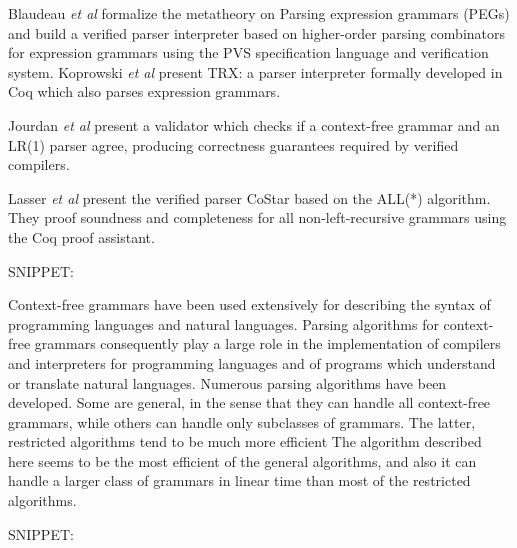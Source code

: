 \begin{isabellebody}
\begin{isamarkuptext}
Blaudeau \textit{et al} \cite{Blaudeau:2020} formalize the metatheory on Parsing expression grammars (PEGs) and
build a verified parser interpreter based on higher-order parsing combinators for expression grammars
using the PVS specification language and verification system. Koprowski \textit{et al} \cite{Koprowski:2011}
present TRX: a parser interpreter formally developed in Coq which also parses expression grammars.

Jourdan \textit{et al} \cite{Jourdan:2012} present a validator which checks if a context-free grammar
and an LR(1) parser agree, producing correctness guarantees required by verified compilers.

Lasser \textit{et al} \cite{Lasser:2021} present the verified parser CoStar based on the ALL(*) algorithm.
They proof soundness and completeness for all non-left-recursive grammars using the Coq proof assistant.%
\end{isamarkuptext}\isamarkuptrue%
%
\isadelimdocument
%
\endisadelimdocument
%
\isatagdocument
%
\isamarkuptrue%
%
\isamarkuptrue%
%
\endisatagdocument
{\isafolddocument}%
%
\isadelimdocument
%
\endisadelimdocument
%
\begin{isamarkuptext}%
SNIPPET:

Context-free grammars have been used extensively for describing the syntax of programming languages
and natural languages. Parsing algorithms for context-free grammars consequently play a large role in
the implementation of compilers and interpreters for programming languages and of programs which understand
or translate natural languages. Numerous parsing algorithms have been developed. Some are general,
in the sense that they can handle all context-free grammars, while others can handle only subclasses of
grammars. The latter, restricted algorithms tend to be much more efficient The algorithm described here
seems to be the most efficient of the general algorithms, and also it can handle a larger class of grammars
in linear time than most of the restricted algorithms.%
\end{isamarkuptext}\isamarkuptrue%
%
\begin{isamarkuptext}%
SNIPPET:


\end{isamarkuptext}
\end{isabellebody}
